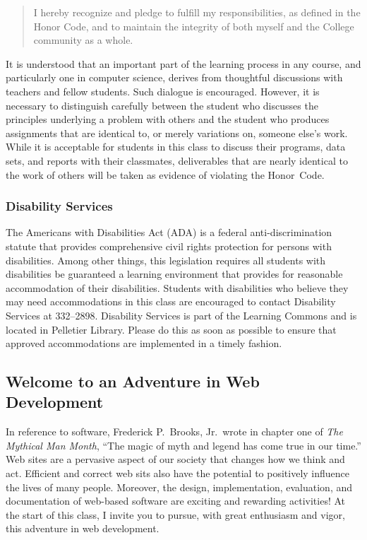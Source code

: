 \documentclass[11pt]{article}
\begin{document}
\vspace*{-.11in}
\begin{quote}
  I hereby recognize and pledge to fulfill my responsibilities, as defined in the Honor Code, and to maintain the
  integrity of both myself and the College community as a whole.
\end{quote}
\vspace*{-.11in}

\noindent It is understood that an important part of the learning process in any course, and particularly one in
computer science, derives from thoughtful discussions with teachers and fellow students. Such dialogue is encouraged.
However, it is necessary to distinguish carefully between the student who discusses the principles underlying a problem
with others and the student who produces assignments that are identical to, or merely variations on, someone else's
work. While it is acceptable for students in this class to discuss their programs, data sets, and reports with their
classmates, deliverables that are nearly identical to the work of others will be taken as evidence of violating the
\mbox{Honor Code}.

\subsubsection*{Disability Services}

The Americans with Disabilities Act (ADA) is a federal anti-discrimination statute that provides comprehensive civil
rights protection for persons with disabilities. Among other things, this legislation requires all students with
disabilities be guaranteed a learning environment that provides for reasonable accommodation of their disabilities.
Students with disabilities who believe they may need accommodations in this class are encouraged to contact Disability
Services at 332--2898. Disability Services is part of the Learning Commons and is located in Pelletier Library.
Please do this as soon as possible to ensure that approved accommodations are implemented in a timely fashion.

\subsection*{Welcome to an Adventure in Web Development}

In reference to software, Frederick P.\ Brooks, Jr.\ wrote in chapter one of {\em The Mythical Man Month}, ``The magic
of myth and legend has come true in our time.'' Web sites are a pervasive aspect of our society that changes how we
think and act. Efficient and correct web sits also have the potential to positively influence the lives of many people.
Moreover, the design, implementation, evaluation, and documentation of web-based software are exciting and rewarding
activities! At the start of this class, I invite you to pursue, with great enthusiasm and vigor, this adventure in web
development.
\end{document}
